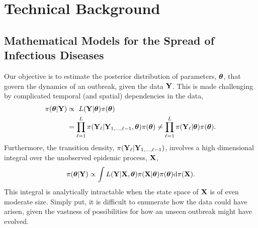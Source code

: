 \chapter{Technical Background}
\label{chap:background}

\section{Mathematical Models for the Spread of Infectious Diseases}
\label{sec:sem_background}

Our objective is to estimate the posterior distribution of parameters, $ \boldsymbol{\theta} $, that govern the dynamics of an outbreak, given the data $ \mathbf{Y} $. This is made challenging by complicated temporal (and spatial) dependencies in the data, 
\begin{align*}
\pi(\boldsymbol{\theta}|\mathbf{Y}) &\propto\ L(\mathbf{Y}|\boldsymbol{\theta})\pi(\boldsymbol{\theta}) \\
&= \prod_{\ell = 1}^{L} \pi(\mathbf{Y}_\ell|\mathbf{Y}_{1,\dots,\ell-1},\boldsymbol{\theta})\pi(\boldsymbol{\theta}) \neq \prod_{\ell = 1}^{L} \pi(\mathbf{Y}_\ell|\boldsymbol{\theta})\pi(\boldsymbol{\theta}).
\end{align*}
Furthermore, the transition density, $ \pi(\mathbf{Y}_{\ell}|\mathbf{Y}_{1,\dots,\ell-1}) $, involves a high dimensional integral over the unobserved epidemic process, $ \mathbf{X} $, 
\begin{equation}
\label{eqn:sem_post}
\pi(\boldsymbol{\theta}|\mathbf{Y}) \propto \int L(\mathbf{Y}|\mathbf{X},\boldsymbol{\theta}) \pi(\mathbf{X}|\boldsymbol{\theta})\pi(\boldsymbol{\theta})\mathrm{d}\pi(\mathbf{X}).
\end{equation}
This integral is analytically intractable when the state space of $ \mathbf{X} $ is of even moderate size. Simply put, it is difficult to enumerate how the data could have arisen, given the vastness of possibilities for how an unseen outbreak might have evolved. 

